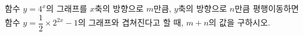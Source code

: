 함수 $y=4^x$의 그래프를 $x$축의 방향으로 $m$만큼, $y$축의 방향으로 $n$만큼 평행이동하면 함수 $y=\dfrac{1}{2}\times 2^{2x}-1$의 그래프와 겹쳐진다고 할 때, $m+n$의 값을 구하시오.
